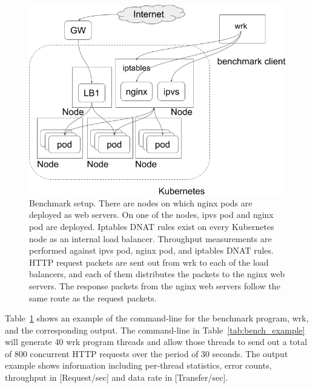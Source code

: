 \begin{figure}[h]
  \centering
  \includegraphics[width=0.8\columnwidth]{Figs/benchmark-schem}
  \par\bigskip
  \centering
  \begin{minipage}{0.8\columnwidth}
    \caption[Benchmark setup]{
Benchmark setup.
There are nodes on which nginx pods are deployed as web servers.
On one of the nodes, ipvs pod and nginx pod are deployed.
Iptables DNAT rules exist on every Kubernetes node as an internal load balancer.
Throughput measurements are performed against ipvs pod, nginx pod, and iptables DNAT rules.
HTTP request packets are sent out from wrk to each of the load balancers, and each of them distributes the packets to the nginx web servers.
The response packets from the nginx web servers follow the same route as the request packets.  
    }
    \label{fig:benchmark-schem}
  \end{minipage}
\end{figure}

Table~\ref{fig:benchmark-schem} shows an example of the command-line for the benchmark program, wrk, and the corresponding output.
The command-line in Table~\ref{tab:bench_example} will generate 40 wrk program threads
and allow those threads to send out a total of 800 concurrent HTTP requests over the period of 30 seconds.
The output example shows information including per-thread statistics, error counts, throughput in [Request/sec] and data rate in [Transfer/sec].

